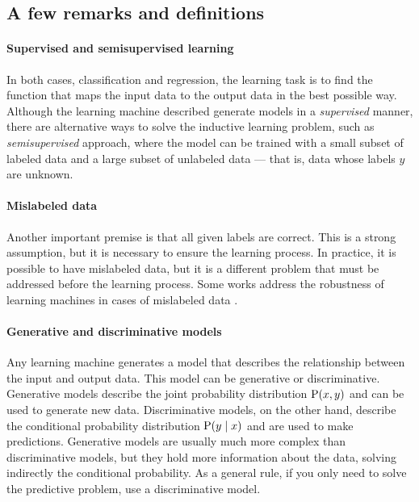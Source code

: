 \subsection{A few remarks and definitions}

\paragraph{Supervised and semisupervised learning}
In both cases, classification and regression, the learning task is to find the function
that maps the input data to the output data in the best possible way.  Although the
learning machine described generate models in a \emph{supervised} manner, there are
alternative ways to solve the inductive learning problem, such as \emph{semisupervised}
approach, where the model can be trained with a small subset of labeled data and a large
subset of unlabeled data --- that is, data whose labels $y$ are unknown.

\paragraph{Mislabeled data}
Another important premise is that all given labels are correct.  This is a strong
assumption, but it is necessary to ensure the learning process.  In practice, it is
possible to have mislabeled data, but it is a different problem that must be addressed
before the learning process.  Some works address the robustness of learning machines
in cases of mislabeled data \parencite{Silva2013}. %

\paragraph{Generative and discriminative models}
Any learning machine generates a model that describes the relationship between the input
and output data.  This model can be generative or discriminative.  Generative models
describe the joint probability distribution $\operatorname{P}(x, y)$ and can be used to generate new
data.  Discriminative models, on the other hand, describe the conditional probability
distribution $\operatorname{P}(y \mid x)$ and are used to make predictions. Generative models are
usually much more complex than discriminative models, but they hold more information about
the data, solving indirectly the conditional probability.  As a general rule, if you only
need to solve the predictive problem, use a discriminative model.

